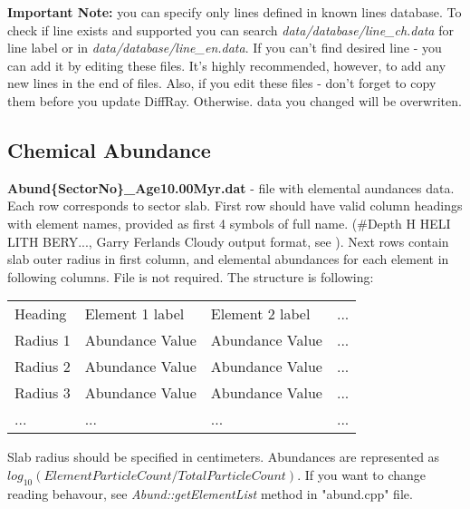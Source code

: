 \documentclass[a4paper]{article}
\begin{document}
    {\bf Important Note: } you can specify only lines defined in known lines database. To check if line exists
    and supported you can search {\it data/database/line\_ch.data} for line label or in {\it data/database/line\_en.data}.
    If you can't find desired line - you can add it by editing these files. It's highly recommended, however, to add any new lines
    in the end of files. Also, if you edit these files - don't forget to copy them before you update DiffRay. Otherwise.
    data you changed will be overwriten.

\subsection{Chemical Abundance}
{\bf Abund\{SectorNo\}\_Age10.00Myr.dat} - file with elemental aundances data. Each row
corresponds to sector slab. First row should have valid column headings
with element names, provided as first 4 symbols of full name. 
(\#Depth		H	HELI	LITH	BERY..., Garry Ferlands Cloudy output 
format, see \cite{Cloudy}).
Next rows contain slab outer radius in first column, 
and elemental abundances for each element in following columns. File is not required.
The structure is following:
\begin{table}[H]
    \begin{tabular}{llll}
        Heading & Element 1 label & Element 2 label & ...\\
        Radius 1 & Abundance Value & Abundance Value & ... \\
        Radius 2 & Abundance Value & Abundance Value & ... \\
        Radius 3 & Abundance Value & Abundance Value & ... \\
        ... & ... & ... & ... \\
    \end{tabular}
\end{table}
Slab radius should be specified in centimeters. Abundances are represented as $log_10(Element Particle Count / Total Particle Count)$.
If you want to change reading behavour, see {\it Abund::getElementList} method in "abund.cpp" file.
\end{document}
